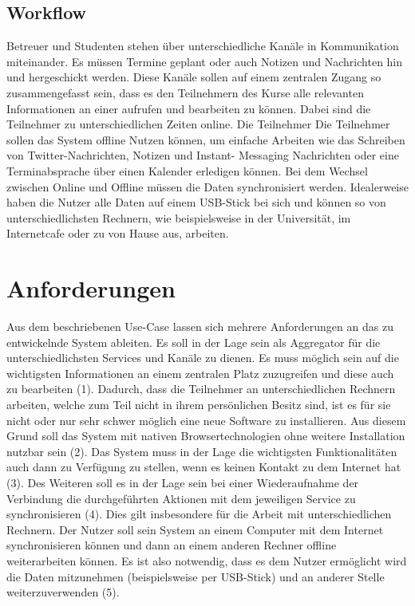 \subsection{Workflow}
Betreuer und Studenten stehen über unterschiedliche Kanäle in Kommunikation miteinander. Es müssen Termine geplant oder auch Notizen und Nachrichten hin und hergeschickt werden. Diese Kanäle sollen auf einem zentralen Zugang so zusammengefasst sein, dass es den Teilnehmern des Kurse alle relevanten Informationen an einer aufrufen und bearbeiten zu können. Dabei sind die Teilnehmer zu unterschiedlichen Zeiten online. Die Teilnehmer Die Teilnehmer sollen das System offline Nutzen können, um einfache Arbeiten wie das Schreiben von Twitter-Nachrichten, Notizen und Instant- Messaging Nachrichten oder eine Terminabsprache über einen Kalender erledigen können. Bei dem Wechsel zwischen Online und Offline müssen die Daten synchronisiert werden. Idealerweise haben die Nutzer alle Daten auf einem USB-Stick bei sich und können so von unterschiedlichsten Rechnern, wie beispielsweise in der Universität, im Internetcafe oder zu von Hause aus, arbeiten.

\section{Anforderungen}
Aus dem beschriebenen Use-Case lassen sich mehrere Anforderungen an das zu entwickelnde System ableiten. Es soll in der Lage sein als Aggregator für die unterschiedlichsten Services und Kanäle zu dienen. Es muss möglich sein auf die wichtigsten Informationen an einem zentralen Platz zuzugreifen und diese auch zu bearbeiten (1). Dadurch, dass die Teilnehmer an unterschiedlichen Rechnern arbeiten, welche zum Teil nicht in ihrem persönlichen Besitz sind, ist es für sie nicht oder nur sehr schwer möglich eine neue Software zu installieren. Aus diesem Grund soll das System mit nativen Browsertechnologien ohne weitere Installation nutzbar sein (2). Das System muss in der Lage die wichtigsten Funktionalitäten auch dann zu Verfügung zu stellen, wenn es keinen Kontakt zu dem Internet hat (3). Des Weiteren soll es in der Lage sein bei einer Wiederaufnahme der Verbindung die durchgeführten Aktionen mit dem jeweiligen Service zu synchronisieren (4). Dies gilt insbesondere für die Arbeit mit unterschiedlichen Rechnern. Der Nutzer soll sein System an einem Computer mit dem Internet synchronisieren können und dann an einem anderen Rechner offline weiterarbeiten können. Es ist also notwendig, dass es dem Nutzer ermöglicht wird die Daten mitzunehmen (beispielsweise per USB-Stick) und an anderer Stelle weiterzuverwenden (5). 

